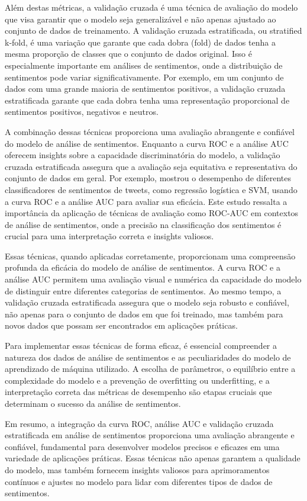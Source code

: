 Além destas métricas, a validação cruzada é uma técnica de avaliação do modelo que visa garantir que o modelo seja generalizável e não apenas ajustado ao conjunto de dados de treinamento. A validação cruzada estratificada, ou stratified k-fold, é uma variação que garante que cada dobra (fold) de dados tenha a mesma proporção de classes que o conjunto de dados original. Isso é especialmente importante em análises de sentimentos, onde a distribuição de sentimentos pode variar significativamente. Por exemplo, em um conjunto de dados com uma grande maioria de sentimentos positivos, a validação cruzada estratificada garante que cada dobra tenha uma representação proporcional de sentimentos positivos, negativos e neutros.

A combinação dessas técnicas proporciona uma avaliação abrangente e confiável do modelo de análise de sentimentos. Enquanto a curva ROC e a análise AUC oferecem insights sobre a capacidade discriminatória do modelo, a validação cruzada estratificada assegura que a avaliação seja equitativa e representativa do conjunto de dados em geral. Por exemplo,  mostrou o desempenho de diferentes classificadores de sentimentos de tweets, como regressão logística e SVM, usando a curva ROC e a análise AUC para avaliar sua eficácia. Este estudo ressalta a importância da aplicação de técnicas de avaliação como ROC-AUC em contextos de análise de sentimentos, onde a precisão na classificação dos sentimentos é crucial para uma interpretação correta e insights valiosos.

Essas técnicas, quando aplicadas corretamente, proporcionam uma compreensão profunda da eficácia do modelo de análise de sentimentos. A curva ROC e a análise AUC permitem uma avaliação visual e numérica da capacidade do modelo de distinguir entre diferentes categorias de sentimentos. Ao mesmo tempo, a validação cruzada estratificada assegura que o modelo seja robusto e confiável, não apenas para o conjunto de dados em que foi treinado, mas também para novos dados que possam ser encontrados em aplicações práticas.

Para implementar essas técnicas de forma eficaz, é essencial compreender a natureza dos dados de análise de sentimentos e as peculiaridades do modelo de aprendizado de máquina utilizado. A escolha de parâmetros, o equilíbrio entre a complexidade do modelo e a prevenção de overfitting ou underfitting, e a interpretação correta das métricas de desempenho são etapas cruciais que determinam o sucesso da análise de sentimentos.

Em resumo, a integração da curva ROC, análise AUC e validação cruzada estratificada em análise de sentimentos proporciona uma avaliação abrangente e confiável, fundamental para desenvolver modelos precisos e eficazes em uma variedade de aplicações práticas. Essas técnicas não apenas garantem a qualidade do modelo, mas também fornecem insights valiosos para aprimoramentos contínuos e ajustes no modelo para lidar com diferentes tipos de dados de sentimentos.

